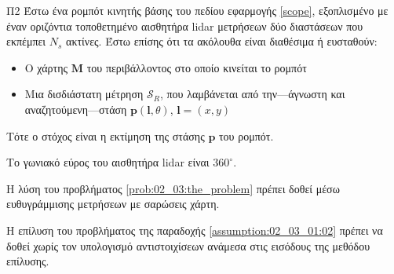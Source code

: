 \begin{bw_box}
\begin{customproblem}{Π2}
  \label{prob:02_03:the_problem}
  Έστω ένα ρομπότ κινητής βάσης του πεδίου εφαρμογής \ref{scope}, εξοπλισμένο με
  έναν οριζόντια τοποθετημένο αισθητήρα lidar μετρήσεων δύο διαστάσεων που
  εκπέμπει $N_s$ ακτίνες. Έστω επίσης ότι τα ακόλουθα είναι διαθέσιμα ή
  ευσταθούν:
  \begin{itemize}
    \item Ο χάρτης $\bm{M}$ του περιβάλλοντος στο οποίο κινείται το ρομπότ
    \item Μια δισδιάστατη μέτρηση $\mathcal{S}_R$, που λαμβάνεται από
          την---άγνωστη και αναζητούμενη---στάση $\bm{p}(\bm{l},\theta)$,
          $\bm{l} = (x,y)$
  \end{itemize}
\end{customproblem}
Τότε ο στόχος είναι η εκτίμηση της στάσης $\bm{p}$ του ρομπότ.
\end{bw_box}

\begin{bw_box}
  \begin{assumption}
    \label{assumption:02_03_01:01}
    Το γωνιακό εύρος του αισθητήρα lidar είναι $360^\circ$.
  \end{assumption}
\end{bw_box}

\begin{bw_box}
  \begin{assumption}
    \label{assumption:02_03_01:02}
    Η λύση του προβλήματος \ref{prob:02_03:the_problem} πρέπει δοθεί μέσω
    ευθυγράμμισης μετρήσεων με σαρώσεις χάρτη.
  \end{assumption}
\end{bw_box}

\begin{bw_box}
  \begin{assumption}
    \label{assumption:02_03_01:03}
    Η επίλυση του προβλήματος της παραδοχής \ref{assumption:02_03_01:02}
    πρέπει να δοθεί χωρίς τον υπολογισμό αντιστοιχίσεων ανάμεσα στις εισόδους
    της μεθόδου επίλυσης.
  \end{assumption}
\end{bw_box}
